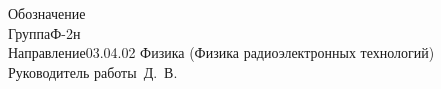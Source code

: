 \begin{titlepage}
\begin{flushleft}
        Обозначение\hspace{1cm}\underline{\hspace{5cm}}\\
        \vspace{.5cm}
        Группа\hspace{2.2cm}Ф-2н\\
        \vspace{.5cm}
        Направление\hspace{1cm}03.04.02 Физика (Физика радиоэлектронных технологий)\\
        \vspace{.5cm}
        Руководитель работы\hfill\underline{\hspace{5cm}}~Д.~В.
    \end{flushleft}

    \vspace{\fill}


\end{titlepage}
